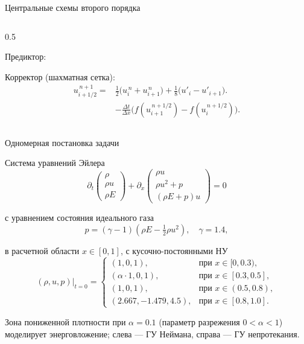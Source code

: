 \documentclass[ignoreonframetext,unicode,aspectratio=169]{beamer}
\begin{document}
\begin{frame}{Центральные схемы второго порядка}
\begin{columns}[t]
\begin{column}{0.5\textwidth}
\begin{block}{Предиктор:}
\[					\]
				\end{block}
				\vspace{-0.2 cm}
				\begin{block}{Корректор (шахматная сетка):}
					\[
					\begin{aligned}
						u_{i+1/2}^{\,n+1}=&\tfrac12\big(u_i^{\,n}+u_{i+1}^{\,n}\big)+\tfrac18\big(u'_i-u'_{i+1}\big).\\[-3pt]
						&-\frac{\Delta t}{\Delta x}\big(f(u_{i+1}^{\,n+1/2})-f(u_i^{\,n+1/2})\big).
					\end{aligned}
					\]
				\end{block}
			\end{column}
		\end{columns}
	\end{frame}

	\begin{frame}{Одномерная постановка задачи}

		\begin{block}{Система уравнений Эйлера}
			\[
			\partial_t \begin{pmatrix} \rho \\ \rho u \\ \rho E \end{pmatrix} +
			\partial_x \begin{pmatrix} \rho u \\ \rho u^2 + p \\ (\rho E + p)u \end{pmatrix} = 0
			\]

			с уравнением состояния идеального газа
			\vspace{-0.3 cm}
			\[
			p = (\gamma - 1)\left( \rho E - \tfrac{1}{2}\rho u^2 \right), \quad \gamma = 1.4,
			\]
		\end{block}
		в расчетной области $x \in [0, 1]$, с кусочно-постоянными НУ
		\vspace{-0.15 cm}
		\[
		(\rho, u, p)|_{t=0} =
		\begin{cases}
			(1, 0, 1), & \text{при } x \in [0, 0.3), \\
			(\alpha \cdot 1, 0, 1), & \text{при } x \in [0.3, 0.5], \\
			(1, 0, 1), & \text{при } x \in (0.5, 0.8), \\
			(2.667, -1.479, 4.5), & \text{при } x \in [0.8, 1.0].
		\end{cases}
		\]

		\vspace{-0.2 cm}
		Зона пониженной плотности при $\alpha = 0.1$ (параметр разрежения $0<\alpha< 1$) моделирует энерговложение; слева --- ГУ Неймана, справа --- ГУ непротекания.
	\end{frame}
\end{document}
